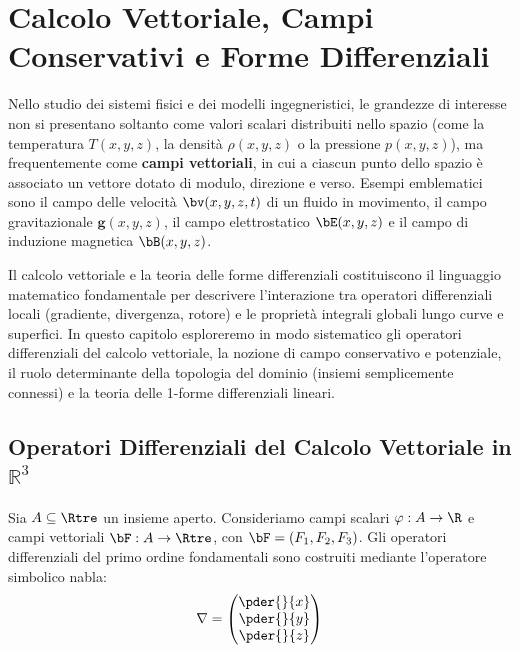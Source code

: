 
\chapter{Calcolo Vettoriale, Campi Conservativi e Forme Differenziali}
\label{chap:calcolo_vettoriale_e_forme_differenziali}

Nello studio dei sistemi fisici e dei modelli ingegneristici, le grandezze di interesse non si presentano soltanto come valori scalari distribuiti nello spazio (come la temperatura $T(x,y,z)$, la densità $\rho(x,y,z)$ o la pressione $p(x,y,z)$), ma frequentemente come \textbf{campi vettoriali}, in cui a ciascun punto dello spazio è associato un vettore dotato di modulo, direzione e verso. Esempi emblematici sono il campo delle velocità $\bv(x,y,z,t)$ di un fluido in movimento, il campo gravitazionale $\mathbf{g}(x,y,z)$, il campo elettrostatico $\bE(x,y,z)$ e il campo di induzione magnetica $\bB(x,y,z)$.

Il calcolo vettoriale e la teoria delle forme differenziali costituiscono il linguaggio matematico fondamentale per descrivere l'interazione tra operatori differenziali locali (gradiente, divergenza, rotore) e le proprietà integrali globali lungo curve e superfici. In questo capitolo esploreremo in modo sistematico gli operatori differenziali del calcolo vettoriale, la nozione di campo conservativo e potenziale, il ruolo determinante della topologia del dominio (insiemi semplicemente connessi) e la teoria delle 1-forme differenziali lineari.

\section{Operatori Differenziali del Calcolo Vettoriale in \texorpdfstring{$\mathbb{R}^3$}{R\textasciicircum 3}}

Sia $A \subseteq \Rtre$ un insieme aperto. Consideriamo campi scalari $\varphi: A \to \R$ e campi vettoriali $\bF: A \to \Rtre$, con $\bF = (F_1, F_2, F_3)$. Gli operatori differenziali del primo ordine fondamentali sono costruiti mediante l'operatore simbolico nabla:
\[
\nabla = \begin{pmatrix} \pder{}{x} \\ \pder{}{y} \\ \pder{}{z} \end{pmatrix}
\]

